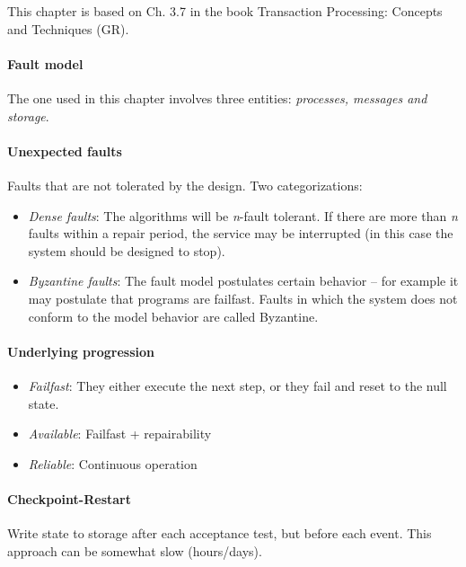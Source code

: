 
This chapter is based on Ch. 3.7 in the book Transaction Processing: Concepts and Techniques (GR).

\sepline

\paragraph{Fault model} The one used in this chapter involves three entities: \textit{processes, messages and storage}.

\paragraph{Unexpected faults} Faults that are not tolerated by the design. Two categorizations:
\begin{itemize}[nolistsep,noitemsep]
  \item \textit{Dense faults}: The algorithms will be \textit{n}-fault tolerant. If there are more than \textit{n} faults within a repair period, the service may be interrupted (in this case the system should be designed to stop).
  \item \textit{Byzantine faults}: The fault model postulates certain behavior -- for example it may postulate that programs are failfast. Faults in which the system does not conform to the model behavior are called Byzantine.
\end{itemize}

\paragraph{Underlying progression}
\begin{itemize}
  \item \textit{Failfast}: They either execute the next step, or they fail and reset to the null state.
  \item \textit{Available}: Failfast + repairability
  \item \textit{Reliable}: Continuous operation
\end{itemize}

\paragraph{Checkpoint-Restart} Write state to storage after each acceptance test, but before each event. This approach can be somewhat slow (hours/days).

